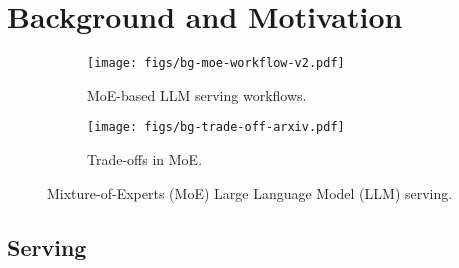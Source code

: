 \section{Background and Motivation}
\label{sec:background}




\begin{figure*}[t]
    \centering
    \begin{subfigure}[t]{0.79\textwidth}
        \centering
        \texttt{[image: figs/bg-moe-workflow-v2.pdf]}
        \caption{MoE-based LLM serving workflows.\protect\footnotemark}
        \label{fig:bg-moe-workflow}
    \end{subfigure}
    \begin{subfigure}[t]{0.2\textwidth}
        \centering
        \texttt{[image: figs/bg-trade-off-arxiv.pdf]}
        \caption{Trade-offs in MoE.}
        \label{fig:bg-trade-off}
    \end{subfigure}
    \vspace{-0.1in}
    \caption{Mixture-of-Experts (MoE) Large Language Model (LLM) serving.}
    \label{fig:bg-moe}
    \vspace{-0.1in}
\end{figure*}



\subsection{\LLM Serving}

